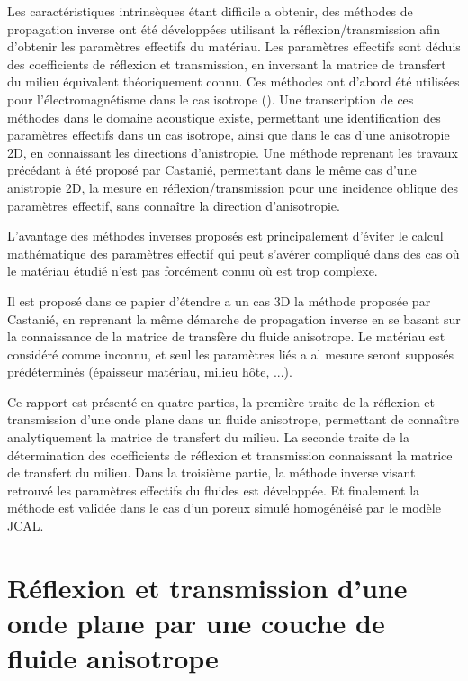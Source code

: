 \documentclass[twoside,openright]{report}
\begin{document}
    Les caractéristiques intrinsèques étant difficile a obtenir, des méthodes de propagation inverse ont été développées utilisant la réflexion/transmission afin d'obtenir les paramètres effectifs du matériau. Les paramètres effectifs sont déduis des coefficients de réflexion et transmission, en inversant la matrice de transfert du milieu équivalent théoriquement connu. Ces méthodes ont d'abord été utilisées pour l'électromagnétisme dans le cas isotrope (\cite{Nicolson}\cite{WEIR}\cite{Markos}\cite{Smith}). Une transcription de ces méthodes dans le domaine acoustique existe, permettant une identification des paramètres effectifs dans un cas isotrope\cite{Fokin2007}, ainsi que dans le cas d'une anisotropie 2D\cite{Zigoneanu2011}, en connaissant les directions d'anistropie.
    Une méthode reprenant les travaux précédant à été proposé par Castanié\cite{Castanie}, permettant dans le même cas d'une anistropie 2D, la mesure en réflexion/transmission pour une incidence oblique des paramètres effectif, sans connaître la direction d'anisotropie. 
    
    L'avantage des méthodes inverses proposés est principalement d'éviter le calcul mathématique des paramètres effectif qui peut s'avérer compliqué dans des cas où le matériau étudié n'est pas forcément connu où est trop complexe.
    
    Il est proposé dans ce papier d'étendre a un cas 3D la méthode proposée par Castanié, en reprenant la même démarche de propagation inverse en se basant sur la connaissance de la matrice de transfère du fluide anisotrope. Le matériau est considéré comme inconnu, et seul les paramètres liés a al mesure seront supposés prédéterminés (épaisseur matériau, milieu hôte, ...).
    
    Ce rapport est présenté en quatre parties, la première traite de la réflexion et transmission d'une onde plane dans un fluide anisotrope, permettant de connaître analytiquement la matrice de transfert du milieu. La seconde traite de la détermination des coefficients de réflexion et transmission connaissant la matrice de transfert du milieu. Dans la troisième partie, la méthode inverse visant retrouvé les paramètres effectifs du fluides est développée. Et finalement la méthode est validée dans le cas d'un poreux simulé homogénéisé par le modèle JCAL.
    
\chapter{Réflexion et transmission d'une onde plane par une couche de fluide anisotrope}
\label{Ch_Prop}
\end{document}
